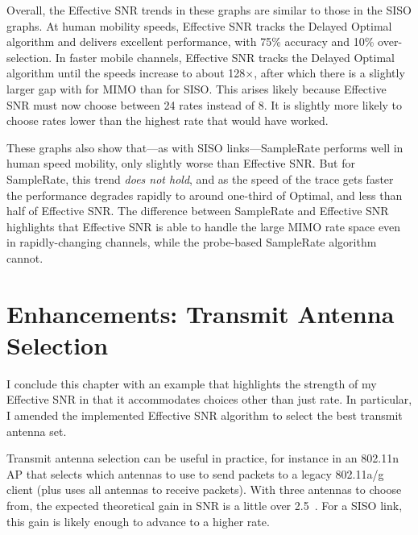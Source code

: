 Overall, the Effective SNR trends in these graphs are similar to those in the SISO graphs. At human mobility speeds, Effective SNR tracks the Delayed Optimal algorithm and delivers excellent performance, with 75\% accuracy and 10\% over-selection. In faster mobile channels, Effective SNR tracks the Delayed Optimal algorithm until the speeds increase to about 128$\times$, after which there is a slightly larger gap with for MIMO than for SISO. This arises likely because Effective SNR must now choose between 24 rates instead of 8. It is slightly more likely to choose rates lower than the highest rate that would have worked.

These graphs also show that---as with SISO links---SampleRate performs well in human speed mobility, only slightly worse than Effective SNR. But for SampleRate, this trend \emph{does not hold}, and as the speed of the trace gets faster the performance degrades rapidly to around one-third of Optimal, and less than half of Effective SNR. The difference between SampleRate and Effective SNR highlights that Effective SNR is able to handle the large MIMO rate space even in rapidly-changing channels, while the probe-based SampleRate algorithm cannot.



\section{Enhancements: Transmit Antenna Selection}
I conclude this chapter with an example that highlights the strength of my Effective SNR in that it accommodates choices other than just rate. In particular, I amended the implemented Effective SNR algorithm to select the best transmit antenna set.

Transmit antenna selection can be useful in practice, for instance in an 802.11n AP that selects which antennas to use to send packets to a legacy 802.11a/g client (plus uses all antennas to receive packets). With three antennas to choose from, the expected theoretical gain in SNR is a little over 2.5\dB~\cite{Goldsmith}. For a SISO link, this gain is likely enough to advance to a higher rate.

